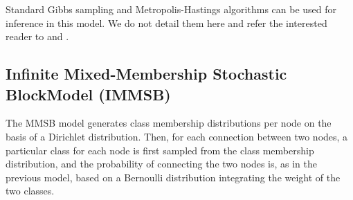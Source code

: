 Standard Gibbs sampling and Metropolis-Hastings algorithms can be used for inference in this model. We do not detail them here and refer the interested reader to \cite{ILFRM} and \cite{IBP}.

%

\subsection{Infinite Mixed-Membership Stochastic BlockModel (IMMSB)}

The MMSB model generates class membership distributions per node on the basis of a Dirichlet distribution. Then, for each connection between two nodes, a particular class for each node is first sampled from the class membership distribution, and the probability of connecting the two nodes is, as in the previous model, based on a Bernoulli distribution integrating the weight of the two classes. 

